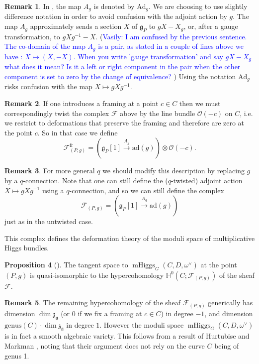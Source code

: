 \documentclass[11pt, oneside, reqno]{amsart}
\theoremstyle{definition} \newtheorem{definition}{Definition}[section]
\newtheorem{prop}[definition]{Proposition}
\theoremstyle{definition} \newtheorem{remark}[definition]{Remark}
\theoremstyle{definition} \newtheorem{remarks}[definition]{Remarks}
\theoremstyle{definition} \newtheorem{question}[definition]{Question}
\theoremstyle{definition} \newtheorem*{note}{Note}
\theoremstyle{definition} \newtheorem{example}[definition]{Example}
\theoremstyle{definition} \newtheorem{examples}[definition]{Examples}
\renewcommand{\gg}{\mathfrak{g}}
\newcommand{\bb}[1]{\mathbb{#1}}
\newcommand{\mr}[1]{\mathrm{#1}}
\newcommand{\mc}[1]{\mathcal{#1}}
\newcommand{\mf}[1]{\mathfrak{#1}}
\newcommand{\OO}{\mathcal{O}}
\DeclareMathOperator{\mhiggs}{mHiggs}
\newcommand{\fr}{\mathrm{fr}}
\newcommand{\ad}{\mr{ad}}
\newcommand{\Ad}{\mr{Ad}}
\newcommand{\vasily}[1]{(\textcolor{blue}{Vasily: #1})}
\begin{document}
\begin{remark}
In \cite{HurtubiseMarkman}, the map $A_g$ is denoted by $\Ad_g$.  We are choosing to use slightly difference notation in order to avoid confusion with the adjoint action by $g$.  The map $A_g$ approximately sends a section $X$ of $\gg_P$ to $gX - X_g$, or, after a gauge transformation, to $gXg^{-1} - X$. 
\vasily{I am confused by the previous sentence. The co-domain of the map $A_g$ is a pair, as stated in a couple of lines above we have : $X \mapsto (X, -X)$.
  When you write 'gauge transformation' and say $g X  - X_g $ what does it mean? Is it a left or right component in the pair when the other component is set to zero by the change of equivalence? }
 Using the notation $\Ad_g$ risks confusion with the map $X \mapsto gXg^{-1}$.
\end{remark}

\begin{remark}
If one introduces a framing at a point $c \in C$ then we must correspondingly twist the complex $\mc F$ above by the line bundle $\OO(-c)$ on $C$, i.e. we restrict to deformations that preserve the framing and therefore are zero at the point $c$.  So in that case we define
\[\mc F^\fr_{(P,g)} = (\gg_P[1] \overset {A_g} {\to} \ad(g)) \otimes \OO(-c).\]
\end{remark}

\begin{remark}
For more general $q$ we should modify this description by replacing $g$ by a $q$-connection.  Note that one can still define the ($q$-twisted) adjoint action $X \mapsto g X g^{-1}$ using a $q$-connection, and so we can still define the complex
\[\mc F_{(P,g)} = (\gg_P[1] \overset {A_g} {\to} \ad(g))\]
just as in the untwisted case.
\end{remark}

This complex defines the deformation theory of the moduli space of multiplicative Higgs bundles.

\begin{prop}[{\cite[Proposition 3.1.3]{Bottacin}}]
The tangent space to $\mhiggs_G(C, D, \omega^\vee)$ at the point $(P,g)$ is quasi-isomorphic to the hypercohomology $\bb H^0(C; \mc F_{(P,g)})$ of the sheaf $\mc F$.
\end{prop}

\begin{remark}
The remaining hypercohomology of the sheaf $\mc F_{(P,g)}$ generically has dimension $\dim \mf z_{\gg}$ (or 0 if we fix a framing at $c \in C$) in degree $-1$, and dimension $\mr{genus}(C) \cdot \dim \mf z_{\gg}$ in degree $1$.  However the moduli space $\mhiggs_G(C, D,\omega^\vee)$ is in fact a smooth algebraic variety.  This follows from a result of Hurtubise and Markman \cite[Theorem 4.13]{HurtubiseMarkman}, noting that their argument does not rely on the curve $C$ being of genus 1.
\end{remark}
\end{document}
